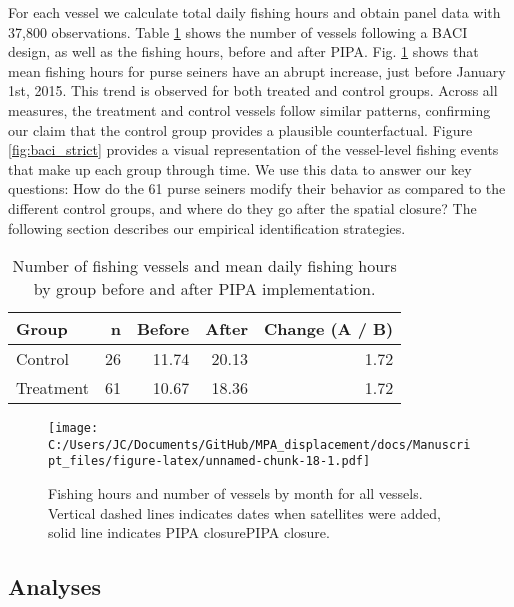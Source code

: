 \documentclass[11pt,]{article}
\begin{document}
For each vessel we calculate total daily fishing hours and obtain panel
data with 37,800 observations. Table \ref{tab:baci_n_s} shows the number
of vessels following a BACI design, as well as the fishing hours, before
and after PIPA. Fig. \ref{fig:all_vessels} shows that mean fishing hours
for purse seiners have an abrupt increase, just before January 1st,
2015. This trend is observed for both treated and control groups. Across
all measures, the treatment and control vessels follow similar patterns,
confirming our claim that the control group provides a plausible
counterfactual. Figure \ref{fig:baci_strict} provides a visual
representation of the vessel-level fishing events that make up each
group through time. We use this data to answer our key questions: How do
the 61 purse seiners modify their behavior as compared to the different
control groups, and where do they go after the spatial closure? The
following section describes our empirical identification strategies.

\begin{table}[H]

\caption{\label{tab:unnamed-chunk-17}\label{tab:baci_n_s}Number of fishing vessels and mean daily fishing hours by group before and after PIPA implementation.}
\centering
\begin{tabular}[t]{lrrrr}
\toprule
Group & n & Before & After & Change (A / B)\\
\midrule
Control & 26 & 11.74 & 20.13 & 1.72\\
Treatment & 61 & 10.67 & 18.36 & 1.72\\
\bottomrule
\end{tabular}
\end{table}

\begin{figure}
\centering
\texttt{[image: C:/Users/JC/Documents/GitHub/MPA\_displacement/docs/Manuscript\_files/figure-latex/unnamed-chunk-18-1.pdf]}
\caption{\label{fig:unnamed-chunk-18}\label{fig:all_vessels}Fishing hours
and number of vessels by month for all vessels. Vertical dashed lines
indicates dates when satellites were added, solid line indicates PIPA
closurePIPA closure.}
\end{figure}

\hypertarget{analyses}{%
\subsection{Analyses}\label{analyses}}
\end{document}
